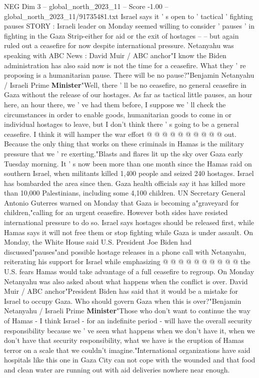 \begin{textsample}{NEG Dim 3 – global\_north\_2023\_11 – Score -1.00 – global\_north\_2023\_11/91735481.txt}  \label{ex:f3_neg_282}
Israel says it ' s open to ' tactical ' fighting pauses STORY : Israeli leader on Monday seemed willing to consider ' pauses ' in fighting in the Gaza Strip-either for aid or the exit of hostages -- -- but again ruled out a ceasefire for now despite international pressure.
Netanyahu was speaking with ABC News : David Muir / ABC anchor"I know the Biden administration has also said now is not the time for a ceasefire.
What they ' re proposing is a humanitarian pause.
There will be no pause?"Benjamin Netanyahu / Israeli Prime \textbf{Minister}"Well, there ' ll be no ceasefire, no general ceasefire in Gaza without the release of our hostages.
As far as tactical little pauses, an hour here, an hour there, we ' ve had them before, I suppose we ' ll check the circumstances in order to enable goods, humanitarian goods to come in or individual hostages to leave, but I don't think there ' s going to be a general ceasefire.
I think it will hamper the war effort @ @ @ @ @ @ @ @ @ @ out.
Because the only thing that works on these criminals in Hamas is the military pressure that we ' re exerting."Blasts and flares lit up the sky over Gaza early Tuesday morning.
It ' s now been more than one month since the Hamas raid on southern Israel, when militants killed 1,400 people and seized 240 hostages.
Israel has bombarded the area since then.
Gaza health officials say it has killed more than 10,000 Palestinians, including some 4,100 children.
UN Secretary General Antonio Guterres warned on Monday that Gaza is becoming a"graveyard for children,"calling for an urgent ceasefire.
However both sides have resisted international pressure to do so.
Israel says hostages should be released first, while Hamas says it will not free them or stop fighting while Gaza is under assault.
On Monday, the White House said U.S.
President Joe Biden had discussed"pauses"and possible hostage releases in a phone call with Netanyahu, reiterating his support for Israel while emphasizing @ @ @ @ @ @ @ @ @ @ the U.S. fears Hamas would take advantage of a full ceasefire to regroup.
On Monday Netanyahu was also asked about what happens when the conflict is over.
David Muir / ABC anchor"President Biden has said that it would be a mistake for Israel to occupy Gaza.
Who should govern Gaza when this is over?"Benjamin Netanyahu / Israeli Prime \textbf{Minister}"Those who don't want to continue the way of Hamas - I think Israel - for an indefinite period - will have the overall security responsibility because we ' ve seen what happens when we don't have it, when we don't have that security responsibility, what we have is the eruption of Hamas terror on a scale that we couldn't imagine."International organizations have said hospitals like this one in Gaza City can not cope with the wounded and that food and clean water are running out with aid deliveries nowhere near enough.

\end{textsample}

